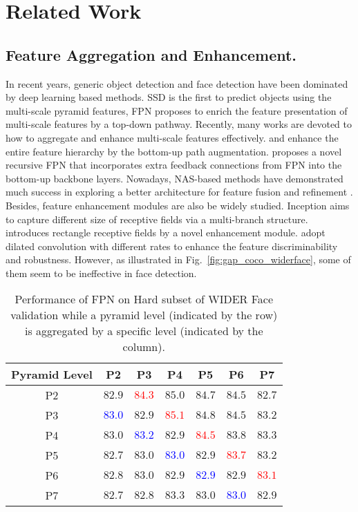 \documentclass[sigconf]{acmart}
\begin{document}
\section{Related Work}
\subsection{Feature Aggregation and Enhancement.}
In recent years, generic object detection and face detection have been dominated by deep learning based methods. SSD \cite{liu2016ssd} is the first to predict objects using the multi-scale pyramid features, FPN \cite{lin2017fpn} proposes to enrich the feature presentation of multi-scale features by a top-down pathway. Recently, many works are devoted to how to aggregate and enhance multi-scale features effectively. \cite{liu2018pafpn} and \cite{tan2020efficientdet} enhance the entire feature hierarchy by the bottom-up path augmentation. \cite{qiao2020detectors} proposes a novel recursive FPN that incorporates extra feedback connections from FPN into the bottom-up backbone layers. 
Nowadays, NAS-based methods have demonstrated much success in exploring a better architecture for feature fusion and refinement \cite{xu2019autofpn,wang2019nasfcos,ghiasi2019nasfpn}.
Besides, feature enhancement modules are also be widely studied. Inception \cite{szegedy2017inception,szegedy2016rethinking} aims to capture different size of receptive fields via a multi-branch structure. \cite{zhang2020refineface} introduces rectangle receptive fields by a novel enhancement module. \cite{qiao2020detectors,li2019dsfd,liu2018rfb} adopt dilated convolution with different rates to enhance the feature discriminability and robustness. However, as illustrated in Fig.~\ref{fig:gap_coco_widerface}, some of them seem to be ineffective in face detection.


\begin{table}[!t]
    \centering
    \begin{tabular}{c|cccccc}
        \toprule[1pt]
        Pyramid Level & P2 & P3 & P4 & P5 & P6 & P7 \\
        \midrule[0.5pt]
        P2 & $82.9$ & \textcolor{red}{$84.3$} & $85.0$ & $84.7$ & $84.5$ & $82.7$ \\
        P3 & \textcolor{blue}{$83.0$} & $82.9$ & \textcolor{red}{$85.1$} & $84.8$ & $84.5$ & $83.2$ \\
        P4 & $83.0$ & \textcolor{blue}{$83.2$} & $82.9$ & \textcolor{red}{$84.5$} & $83.8$ & $83.3$\\
        P5 & $82.7$ & $83.0$ & \textcolor{blue}{$83.0$} & $82.9$ & \textcolor{red}{$83.7$} & $83.2$ \\
        P6 & $82.8$ & $83.0$ & $82.9$ & \textcolor{blue}{$82.9$} & $82.9$ & \textcolor{red}{$83.1$} \\
        P7 & $82.7$ & $82.8$ & $83.3$ & $83.0$ & \textcolor{blue}{$83.0$} & $82.9$ \\
        \bottomrule[1pt]
    \end{tabular}
\caption{ Performance of FPN on Hard subset of WIDER Face validation while a pyramid level (indicated by the row) is aggregated by a specific level (indicated by the column).}
    \label{tab:pyramid_fa}
\end{table}
\end{document}
